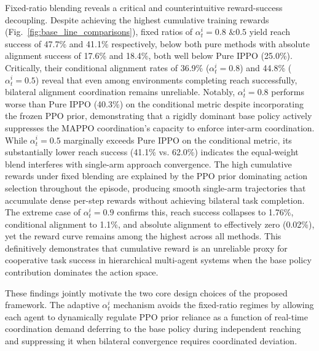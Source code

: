 \documentclass[a4paper,fleqn]{cas-dc}
\begin{document}
Fixed-ratio blending reveals a critical and counterintuitive reward-success decoupling. Despite achieving the highest cumulative training rewards (Fig.~\ref{fig:base_line_comparisons}), fixed ratios of $\alpha^{i}_{t}=0.8 \text{ \& }0.5$ yield reach success of 47.7\% and 41.1\% respectively, below both pure methods with absolute alignment success of 17.6\% and 18.4\%, both well below Pure IPPO (25.0\%). Critically, their conditional alignment rates of 36.9\% ($\alpha^{i}_{t}=0.8$) and 44.8\% ($\alpha^{i}_{t}=0.5$) reveal that even among environments completing reach successfully, bilateral alignment coordination remains unreliable. Notably, $\alpha^{i}_{t}=0.8$ performs worse than Pure IPPO (40.3\%) on the conditional metric despite incorporating the frozen PPO prior, demonstrating that a rigidly dominant base policy actively suppresses the MAPPO coordination's capacity to enforce inter-arm coordination. While $\alpha^{i}_{t}=0.5$ marginally exceeds Pure IPPO on the conditional metric, its substantially lower reach success (41.1\% vs. 62.0\%) indicates the equal-weight blend interferes with single-arm approach convergence. The high cumulative rewards under fixed blending are explained by the PPO prior dominating action selection throughout the episode, producing smooth single-arm trajectories that accumulate dense per-step rewards without achieving bilateral task completion. The extreme case of $\alpha^{i}_{t}=0.9$ confirms this, reach success collapses to 1.76\%, conditional alignment to 1.1\%, and absolute alignment to effectively zero (0.02\%), yet the reward curve remains among the highest across all methods. This definitively demonstrates that cumulative reward is an unreliable proxy for cooperative task success in hierarchical multi-agent systems when the base policy contribution dominates the action space.

These findings jointly motivate the two core design choices of the proposed framework. The adaptive $\alpha^{i}_{t}$ mechanism avoids the fixed-ratio regimes by allowing each agent to dynamically regulate PPO prior reliance as a function of real-time coordination demand deferring to the base policy during independent reaching and suppressing it when bilateral convergence requires coordinated deviation. 
\end{document}
